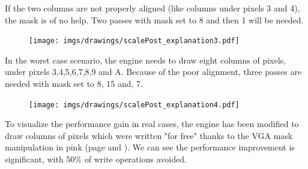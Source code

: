 \label{simd_vga}
If the two columns are not properly aligned (like columns under pixels 3 and 4), the mask is of no help. Two passes with mask set to 8 and then 1 will be needed.\\
 \par
 \begin{minipage}{\textwidth}

\end{minipage}
\par
  \begin{figure}[H]
 \centering
 \texttt{[image: imgs/drawings/scalePost\_explanation3.pdf]}
 \end{figure}


In the worst case scenario, the engine needs to draw eight columns of pixels, under pixels 3,4,5,6,7,8,9 and A. Because of the poor alignment, three passes are needed with mask set to 8, 15 and, 7.\\
 \par
 \begin{minipage}{\textwidth}

\end{minipage}
\par
  \begin{figure}[H]
 \centering
 \texttt{[image: imgs/drawings/scalePost\_explanation4.pdf]}
 \end{figure}


% 
  






To visualize the performance gain in real cases, the engine has been modified to draw columns of pixels which were written "for free" thanks to the VGA mask manipulation in pink (page \pageref{wolf3d_in_pink} and \pageref{wolf3d_in_pink2}). We can see the performance improvement is significant, with 50\% of write operations avoided.

